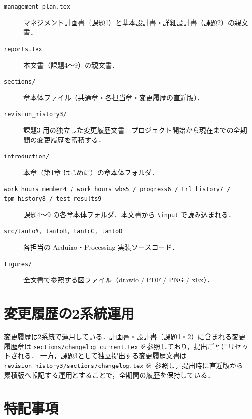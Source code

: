 \begin{description}
  \item[\texttt{management\_plan.tex}] マネジメント計画書（課題1）と基本設計書・詳細設計書（課題2）の親文書．
  \item[\texttt{reports.tex}] 本文書（課題4〜9）の親文書．
  \item[\texttt{sections/}] 章本体ファイル（共通章・各担当章・変更履歴の直近版）．
  \item[\texttt{revision\_history3/}] 課題3 用の独立した変更履歴文書．プロジェクト開始から現在までの全期間の変更履歴を蓄積する．
  \item[\texttt{introduction/}] 本章（第1章 はじめに）の章本体フォルダ．
  \item[\texttt{work\_hours\_member4 / work\_hours\_wbs5 / progress6 / trl\_history7 / tpm\_history8 / test\_results9}] 課題4〜9 の各章本体フォルダ．本文書から \texttt{\textbackslash input} で読み込まれる．
  \item[\texttt{src/tantoA, tantoB, tantoC, tantoD}] 各担当の Arduino・Processing 実装ソースコード．
  \item[\texttt{figures/}] 全文書で参照する図ファイル（drawio / PDF / PNG / xlsx）．
\end{description}

\section{変更履歴の2系統運用}

変更履歴は2系統で運用している．計画書・設計書（課題1・2）に含まれる変更履歴章は
\texttt{sections/changelog\_current.tex} を参照しており，提出ごとにリセットされる．
一方，課題3として独立提出する変更履歴文書は \texttt{revision\_history3/sections/changelog.tex} を
参照し，提出時に直近版から累積版へ転記する運用とすることで，全期間の履歴を保持している．

\section{特記事項}

